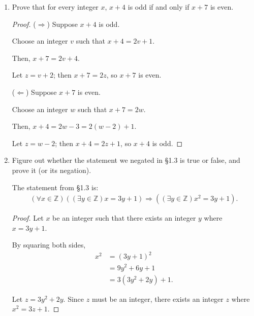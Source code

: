 \documentclass{article}
\newcommand{\negation}[1]{\textbf{Negation:} #1}
\begin{document}
\begin{enumerate}
\begin{enumerate}
\begin{proof}
          Then, $x^3 = 8w^3+12w^2+6w+1$.

          Let $z=4w^3+6w^2+3w$; then $x^3=2z+1$, so $x^3$ is odd.
        \end{proof}

        \negation{There is an integer $x$ such that $x$ is odd and
        $x^3$ is even.}

    \end{enumerate}
  \item Prove that for every integer $x$, $x + 4$ is odd if and only
    if $x + 7$ is even.

    \begin{proof}
      ($\Rightarrow$) Suppose $x+4$ is odd.

      Choose an integer $v$ such that $x+4=2v+1$.

      Then, $x+7 = 2v+4$.

      Let $z=v+2$; then $x+7 = 2z$, so $x+7$ is even.

      ($\Leftarrow$) Suppose $x+7$ is even.

      Choose an integer $w$ such that $x+7=2w$.

      Then, $x+4=2w-3=2(w-2)+1$.

      Let $z=w-2$; then $x+4=2z+1$, so $x+4$ is odd.
    \end{proof}

  \item Figure out whether the statement we negated in \S1.3 is true
    or false, and prove it (or its negation).

    The statement from \S1.3 is:
    \begin{align}
      (\forall x \in \mathbb{Z}) \left((\exists y \in \mathbb{Z}) x =
      3y + 1\right) \Rightarrow \left((\exists y \in \mathbb{Z}) x^2
      = 3y + 1\right).
    \end{align}

    \begin{proof}
      Let $x$ be an integer such that there exists an integer $y$
      where $x=3y+1$.

      By squaring both sides,
      \begin{align}
        x^2 &= (3y+1)^2 \\
        &= 9y^2+6y+1 \\
        &= 3(3y^2+2y) + 1.
      \end{align}

      Let $z=3y^2+2y$.
      Since $z$ must be an integer, there exists an integer $z$ where
      $x^2=3z+1$.
    \end{proof}


\end{enumerate}
\end{document}
